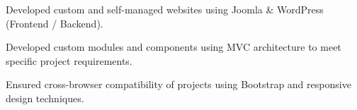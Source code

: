 \documentclass[]{deedy-resume-openfont}
\begin{document}
\sectionsep
{}
\sectionsep
%
%
\newpage
{}\hfill {}
\begin{tightemize}
	\item Developed custom and self-managed websites using Joomla \& WordPress (Frontend / Backend).
	\item Developed custom modules and components using MVC architecture to meet specific project requirements.
	\item Ensured cross-browser compatibility of projects using Bootstrap and responsive design techniques.
\end{tightemize}
\sectionsep
{}
\sectionsep
%
%
\end{document}
